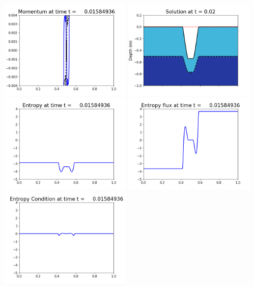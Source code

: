 \documentclass[11pt]{article}
\begin{document}
\vskip 10pt 
\includegraphics[width=0.475\textwidth]{frame0046fig1003.png}
\includegraphics[width=0.475\textwidth]{frame0046fig1006.png}
\vskip 10pt 
\includegraphics[width=0.475\textwidth]{frame0046fig1007.png}
\includegraphics[width=0.475\textwidth]{frame0046fig1008.png}
\vskip 10pt 
\includegraphics[width=0.475\textwidth]{frame0046fig1009.png}
\end{document}
